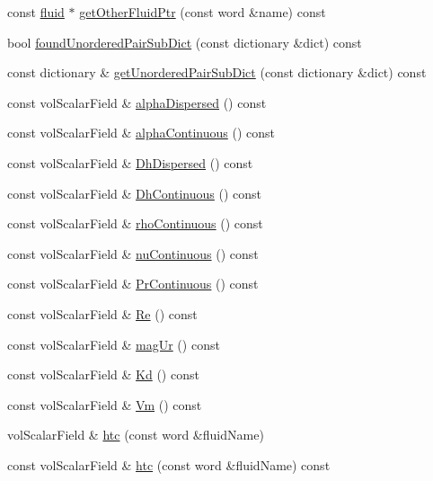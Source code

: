 \begin{DoxyCompactItemize}
\item 
const \hyperlink{classFoam_1_1fluid}{fluid} $\ast$ \hyperlink{classFoam_1_1FFPair_a035b59dd5b6bddd26d57c53ecd89cf03}{get\+Other\+Fluid\+Ptr} (const word \&name) const
\item 
bool \hyperlink{classFoam_1_1FFPair_a01cfeb6abd47cb6594322646ef9e5d2b}{found\+Unordered\+Pair\+Sub\+Dict} (const dictionary \&dict) const
\item 
const dictionary \& \hyperlink{classFoam_1_1FFPair_aefb871e3bdf791a96a332aade3f41c46}{get\+Unordered\+Pair\+Sub\+Dict} (const dictionary \&dict) const
\item 
const vol\+Scalar\+Field \& \hyperlink{classFoam_1_1FFPair_abc4414405124181c96bee2bde03d4948}{alpha\+Dispersed} () const
\item 
const vol\+Scalar\+Field \& \hyperlink{classFoam_1_1FFPair_afd30d939fd44763d6cfe19c60aa5f133}{alpha\+Continuous} () const
\item 
const vol\+Scalar\+Field \& \hyperlink{classFoam_1_1FFPair_ad8295df5c389aaf2458d0e48e72a619a}{Dh\+Dispersed} () const
\item 
const vol\+Scalar\+Field \& \hyperlink{classFoam_1_1FFPair_abd8a1d4c657219350b0e700d711202a9}{Dh\+Continuous} () const
\item 
const vol\+Scalar\+Field \& \hyperlink{classFoam_1_1FFPair_a4bf5944b6352c22f56051b75039fbb9e}{rho\+Continuous} () const
\item 
const vol\+Scalar\+Field \& \hyperlink{classFoam_1_1FFPair_a3651282fe12075caa88e29d51a230994}{nu\+Continuous} () const
\item 
const vol\+Scalar\+Field \& \hyperlink{classFoam_1_1FFPair_abc219815dd5cb61f5c56c1f21b18b0ad}{Pr\+Continuous} () const
\item 
const vol\+Scalar\+Field \& \hyperlink{classFoam_1_1FFPair_a657f374be896f550786309f405afb0fc}{Re} () const
\item 
const vol\+Scalar\+Field \& \hyperlink{classFoam_1_1FFPair_accf8e1581e1247f394e800d7e10a6117}{mag\+Ur} () const
\item 
const vol\+Scalar\+Field \& \hyperlink{classFoam_1_1FFPair_ade6b59ce6adfda29326c86582f754097}{Kd} () const
\item 
const vol\+Scalar\+Field \& \hyperlink{classFoam_1_1FFPair_a24c20ea8c605cf1fbf531c72e46d729d}{Vm} () const
\item 
vol\+Scalar\+Field \& \hyperlink{classFoam_1_1FFPair_a6a17b7325276be2c2fc8236f9cb33faa}{htc} (const word \&fluid\+Name)
\item 
const vol\+Scalar\+Field \& \hyperlink{classFoam_1_1FFPair_ada4eeac83873d7c788ebc6debd03eaa1}{htc} (const word \&fluid\+Name) const

\end{DoxyCompactItemize}
